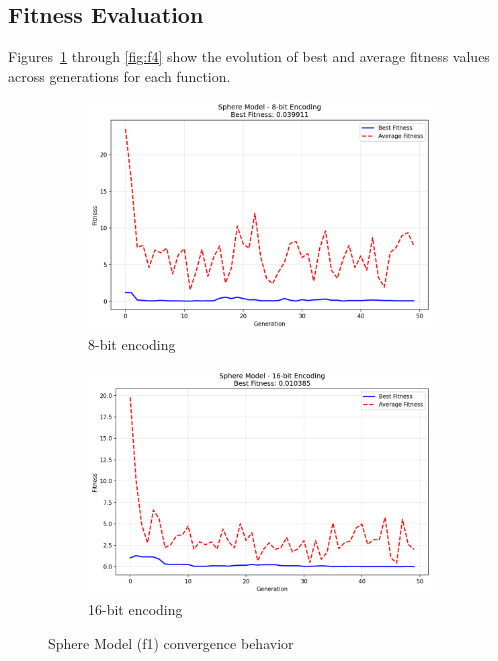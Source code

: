 \documentclass[journal,12pt,onecolumn]{IEEEtran}
\begin{document}
\subsection{Fitness Evaluation}
Figures~\ref{fig:f1} through \ref{fig:f4} show the evolution of best and average fitness values across generations for each function.

\begin{figure}[H]
\centering
\begin{subfigure}{0.48\textwidth}
    \includegraphics[width=\textwidth]{f1_8bit_fitness.png}
    \caption{8-bit encoding}
\end{subfigure}
\begin{subfigure}{0.48\textwidth}
    \includegraphics[width=\textwidth]{f1_16bit_fitness.png}
    \caption{16-bit encoding}
\end{subfigure}
\caption{Sphere Model (f1) convergence behavior}
\label{fig:f1}
\end{figure}
\end{document}

